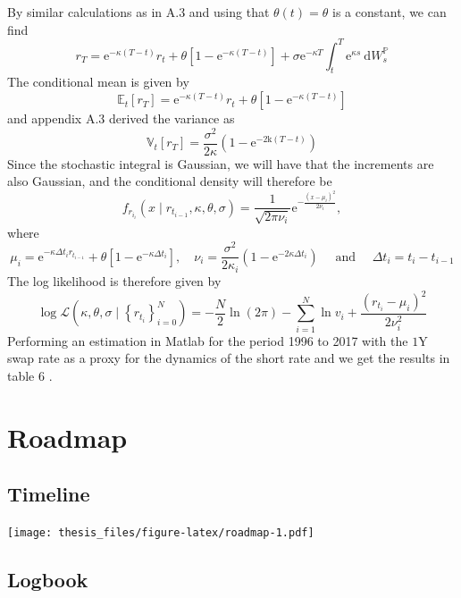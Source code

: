 \documentclass[12pt,twoside]{reedthesis}
\begin{document}
By similar calculations as in A.3 and using that \(\theta(t)=\theta\) is a constant, we can find
\[
r_{T}=\mathrm{e}^{-\kappa(T-t)} r_{t}+\theta\left[1-\mathrm{e}^{-\kappa(T-t)}\right]+\sigma \mathrm{e}^{-\kappa T} \int_{t}^{T} \mathrm{e}^{\kappa s} \mathrm{~d} W_{s}^{\mathbb{P}}
\]
The conditional mean is given by
\[
\mathbb{E}_{t}\left[r_{T}\right]=\mathrm{e}^{-\kappa(T-t)} r_{t}+\theta\left[1-\mathrm{e}^{-\kappa(T-t)}\right]
\]
and appendix A.3 derived the variance as
\[
\mathbb{V}_{t}\left[r_{T}\right]=\frac{\sigma^{2}}{2 \kappa}\left(1-\mathrm{e}^{-2 \mathrm{k}(T-t)}\right)
\]
Since the stochastic integral is Gaussian, we will have that the increments are also Gaussian, and the conditional density will therefore be
\[
f_{r_{i_{i}}}\left(x \mid r_{t_{i-1}}, \kappa, \theta, \sigma\right)=\frac{1}{\sqrt{2 \pi \nu_{i}}} \mathrm{e}^{-\frac{\left(x-\mu_{i}\right)^{2}}{2 \nu_{i}}},
\]
where
\[
\mu_{i}=\mathrm{e}^{-\kappa \Delta t_{i} r_{t_{i-1}}}+\theta\left[1-\mathrm{e}^{-\kappa \Delta t_{i}}\right], \quad \nu_{i}=\frac{\sigma^{2}}{2 \kappa_{i}}\left(1-\mathrm{e}^{-2 \kappa \Delta t_{i}}\right) \quad \text { and } \quad \Delta t_{i}=t_{i}-t_{i-1}
\]
The log likelihood is therefore given by
\[
\log \mathcal{L}\left(\kappa, \theta, \sigma \mid\left\{r_{t_{i}}\right\}_{i=0}^{N}\right)=-\frac{N}{2} \ln (2 \pi)-\sum_{i=1}^{N} \ln v_{i}+\frac{\left(r_{t_{i}}-\mu_{i}\right)^{2}}{2 \nu_{i}^{2}}
\]
Performing an estimation in Matlab for the period 1996 to 2017 with the \(1 \mathrm{Y}\) swap rate as a proxy for the dynamics of the short rate and we get the results in table 6 .

\hypertarget{roadmap}{%
\chapter*{Roadmap}\label{roadmap}}

\hypertarget{timeline}{%
\section*{Timeline}\label{timeline}}

\texttt{[image: thesis\_files/figure-latex/roadmap-1.pdf]}

\hypertarget{logbook}{%
\section*{Logbook}\label{logbook}}
\end{document}
